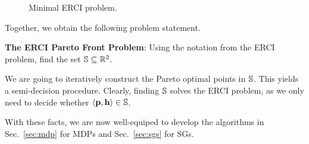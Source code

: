 {{{\begin{figure}
\begin{subfigure}{0.2\columnwidth}
\begin{tikzpicture}
\end{tikzpicture}
\caption{}
\end{subfigure}
\begin{subfigure}{0.38\columnwidth}
\centering
{}
\caption{}
\end{subfigure}
\begin{subfigure}{0.38\columnwidth}
\centering
{}
\caption{}
\end{subfigure}

\caption{Minimal ERCI problem.}
\end{figure}


Together, we obtain the following problem statement.
\begin{mdframed}[backgroundcolor=white!5]
\textbf{The ERCI Pareto Front Problem}:
Using the notation from the ERCI problem, find the set $\solutions \subseteq \mathbb{R}^2$.
\end{mdframed}
We are going to iteratively construct the  Pareto optimal points in $\solutions$. This yields a semi-decision procedure.
Clearly, finding $\solutions$ solves the ERCI problem, as we only need to decide whether $\langle \scthreshold, \randomness \rangle \in \solutions$.



With these facts, we are now well-equiped to develop the algorithms in Sec.~\ref{sec:mdp} for MDPs and Sec.~\ref{sec:sgs} for SGs.

}}}
